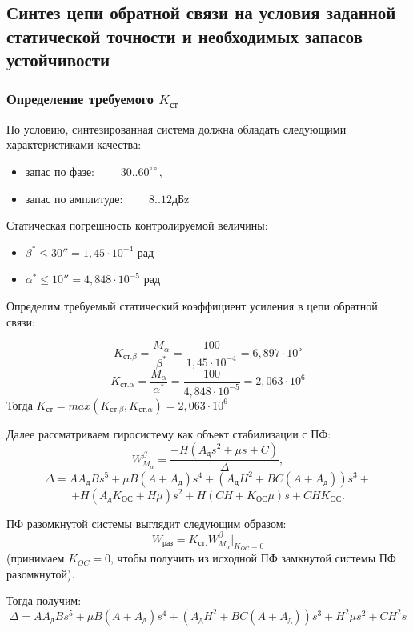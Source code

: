 \documentclass[main.tex]{subfiles}
\begin{document}
\newcommand{\Mdd}{M_\text{ДД}}
\newcommand{\Koc}{K_\text{ОС}}
\newcommand{\Ad}{A_\text{д}}
\newcommand{\ad}{\alpha_\text{д}}

\subsection{Синтез цепи обратной связи на условия заданной статической точности и необходимых
запасов устойчивости}

\subsubsection*{Определение требуемого \( K_\text{ст} \)}
По условию, синтезированная система должна обладать следующими
характеристиками качества:
\begin{itemize}
    \item запас по фазе: \( \qquad 30..60^{\circ\circ} \),
    \item запас по амплитуде: \( \qquad 8..12 \text{дБ} \)z
\end{itemize}
Статическая погрешность контролируемой величины:
\begin{itemize}
    \item \( \beta^* \leq 30'' = 1,45 \cdot 10^{-4} \) рад
    \item \( \alpha^* \leq 10'' = 4,848 \cdot 10^{-5} \) рад
\end{itemize}
Определим требуемый статический коэффициент усиления в цепи обратной связи:

 \[ K_{\text{ст.}\beta} = \frac{M_\alpha}{\beta^*} = 
    \frac{100}{1,45 \cdot 10^{-4}} = 6,897 \cdot 10^{5} \]
\[ K_{\text{ст.}\alpha} = \frac{M_\alpha}{\alpha^*} = 
\frac{100}{4,848 \cdot 10^{-5}} = 2,063 \cdot 10^{6} \]
Тогда \( K_\text{ст} = max(K_{\text{ст.}\beta}, K_{\text{ст.}\alpha}) = 2,063 \cdot 10^{6} \)

Далее рассматриваем гиросистему как объект стабилизации 
с ПФ: 
 \[ W^{\beta}_{M_{\alpha}} = \frac{-H(\Ad s^2 + \mu s + C)}{\Delta}, \]
 \[ \Delta = A\Ad B s^5 + \mu B(A+\Ad)s^4 + (\Ad H^2+BC(A+\Ad))s^3 + \] 
        \[+ H(\Ad\Koc+H\mu)s^2 + H(CH+\Koc\mu)s + CH\Koc. \] \par

ПФ разомкнутой системы выглядит следующим образом: 
 \[ W_\text{раз} = K_\text{ст.} W^{\beta}_{M_{\alpha}}|_{K_{OC}=0} \] 
 (принимаем \( K_{OC}=0 \), чтобы получить из исходной ПФ замкнутой системы ПФ разомкнутой).

Тогда получим:
\[ \Delta = A\Ad B s^5 + \mu B(A+\Ad)s^4 + (\Ad H^2+BC(A+\Ad))s^3 +  
        H^2\mu s^2 + CH^2s \]
\end{document}
